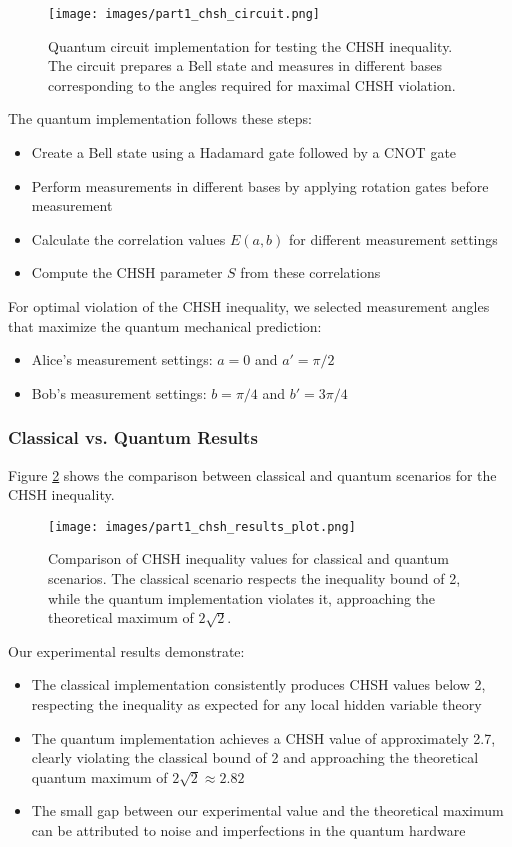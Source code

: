 \documentclass[12pt,a4paper]{article}
\begin{document}
\begin{figure}[h]
\centering
\texttt{[image: images/part1\_chsh\_circuit.png]}
\caption{Quantum circuit implementation for testing the CHSH inequality. The circuit prepares a Bell state and measures in different bases corresponding to the angles required for maximal CHSH violation.}
\label{fig:chsh_circuit}
\end{figure}

The quantum implementation follows these steps:
\begin{itemize}
    \item Create a Bell state using a Hadamard gate followed by a CNOT gate
    \item Perform measurements in different bases by applying rotation gates before measurement
    \item Calculate the correlation values $E(a,b)$ for different measurement settings
    \item Compute the CHSH parameter $S$ from these correlations
\end{itemize}

For optimal violation of the CHSH inequality, we selected measurement angles that maximize the quantum mechanical prediction:
\begin{itemize}
    \item Alice's measurement settings: $a = 0$ and $a' = \pi/2$
    \item Bob's measurement settings: $b = \pi/4$ and $b' = 3\pi/4$
\end{itemize}

\subsubsection{Classical vs. Quantum Results}

Figure \ref{fig:chsh_results} shows the comparison between classical and quantum scenarios for the CHSH inequality.

\begin{figure}[h]
\centering
\texttt{[image: images/part1\_chsh\_results\_plot.png]}
\caption{Comparison of CHSH inequality values for classical and quantum scenarios. The classical scenario respects the inequality bound of 2, while the quantum implementation violates it, approaching the theoretical maximum of $2\sqrt{2}$.}
\label{fig:chsh_results}
\end{figure}

Our experimental results demonstrate:
\begin{itemize}
    \item The classical implementation consistently produces CHSH values below 2, respecting the inequality as expected for any local hidden variable theory
    \item The quantum implementation achieves a CHSH value of approximately 2.7, clearly violating the classical bound of 2 and approaching the theoretical quantum maximum of $2\sqrt{2} \approx 2.82$
    \item The small gap between our experimental value and the theoretical maximum can be attributed to noise and imperfections in the quantum hardware
\end{itemize}
\end{document}
